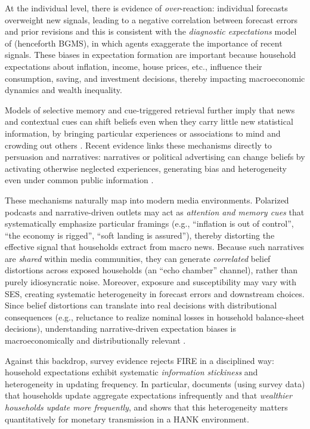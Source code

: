 \documentclass[12pt]{article}
\begin{document}
At the individual level, there is evidence of \emph{over}-reaction: individual forecasts overweight new signals, leading to a negative correlation between forecast errors and prior revisions and this is consistent with the \textit{diagnostic expectations} model of \citet{BordaloGennaioliMaShleifer2020} (henceforth BGMS), in which agents exaggerate the importance of recent signals. These biases in expectation formation are important because household expectations about inflation, income, house prices, etc., influence their consumption, saving, and investment decisions, thereby impacting macroeconomic dynamics and wealth inequality.

Models of selective memory and cue-triggered retrieval further imply that news and contextual cues can shift beliefs even when they carry little new statistical information, by bringing particular experiences or associations to mind and crowding out others \citep{BordaloGennaioliShleifer2020MemoryAttentionChoice}. Recent evidence links these mechanisms directly to persuasion and narratives: narratives or political advertising can change beliefs by activating otherwise neglected experiences, generating bias and heterogeneity even under common public information \citep{BordaloConlonGennaioliKwonShleifer2026HowPeopleUseStatistics,BordaloBurroCoffmanGennaioliShleifer2025ImaginingFuture}.

These mechanisms naturally map into modern media environments. Polarized podcasts and narrative-driven outlets may act as \emph{attention and memory cues} that systematically emphasize particular framings (e.g., ``inflation is out of control'', ``the economy is rigged'', ``soft landing is assured''), thereby distorting the effective signal that households extract from macro news. Because such narratives are \emph{shared} within media communities, they can generate \emph{correlated} belief distortions across exposed households (an ``echo chamber'' channel), rather than purely idiosyncratic noise. Moreover, exposure and susceptibility may vary with SES, creating systematic heterogeneity in forecast errors and downstream choices. Since belief distortions can translate into real decisions with distributional consequences (e.g., reluctance to realize nominal losses in household balance-sheet decisions), understanding narrative-driven expectation biases is macroeconomically and distributionally relevant \citep{GarnacheSchmalzSommervollStickyAssetPrices}.

Against this backdrop, survey evidence rejects FIRE in a disciplined way: household expectations exhibit systematic \emph{information stickiness} and heterogeneity in updating frequency. In particular, \citet{difrancesco2024_sticky_information_wealth} documents (using survey data) that households update aggregate expectations infrequently and that \emph{wealthier households update more frequently}, and shows that this heterogeneity matters quantitatively for monetary transmission in a HANK environment.
\end{document}
